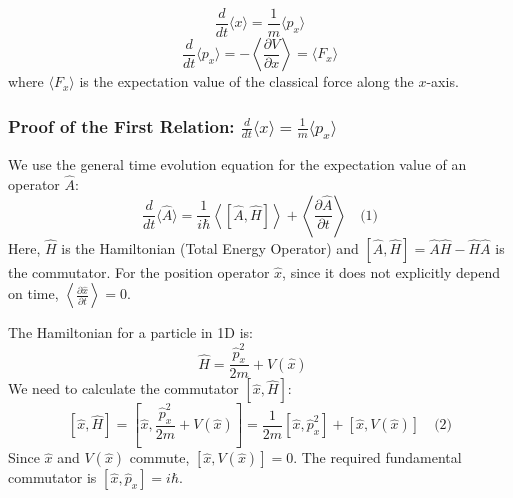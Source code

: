 \documentclass[12pt]{article}
\begin{document}
$$
\frac{d}{dt} \langle x \rangle = \frac{1}{m} \langle p_x \rangle
$$
$$
\frac{d}{dt} \langle p_x \rangle = -\left\langle \frac{\partial V}{\partial x} \right\rangle = \langle F_x \rangle
$$
where $\langle F_x \rangle$ is the expectation value of the classical force along the $x$-axis.

\subsubsection*{Proof of the First Relation: $\frac{d}{dt} \langle x \rangle = \frac{1}{m} \langle p_x \rangle$}

We use the general time evolution equation for the expectation value of an operator $\hat{A}$:
$$
\frac{d}{dt} \langle \hat{A} \rangle = \frac{1}{i\hbar} \left\langle [\hat{A}, \hat{H}] \right\rangle + \left\langle \frac{\partial \hat{A}}{\partial t} \right\rangle \quad \text{(1)}
$$
Here, $\hat{H}$ is the Hamiltonian (Total Energy Operator) and $[\hat{A}, \hat{H}] = \hat{A}\hat{H} - \hat{H}\hat{A}$ is the commutator.
For the position operator $\hat{x}$, since it does not explicitly depend on time, $\left\langle \frac{\partial \hat{x}}{\partial t} \right\rangle = 0$.

The Hamiltonian for a particle in 1D is:
$$
\hat{H} = \frac{\hat{p}_x^2}{2m} + V(\hat{x}) \quad \text{}
$$
We need to calculate the commutator $[\hat{x}, \hat{H}]$:
$$
[\hat{x}, \hat{H}] = \left[\hat{x}, \frac{\hat{p}_x^2}{2m} + V(\hat{x})\right] = \frac{1}{2m} [\hat{x}, \hat{p}_x^2] + [\hat{x}, V(\hat{x})] \quad \text{(2)}
$$
Since $\hat{x}$ and $V(\hat{x})$ commute, $[\hat{x}, V(\hat{x})] = 0$.
The required fundamental commutator is $[\hat{x}, \hat{p}_x] = i\hbar$.
\end{document}
